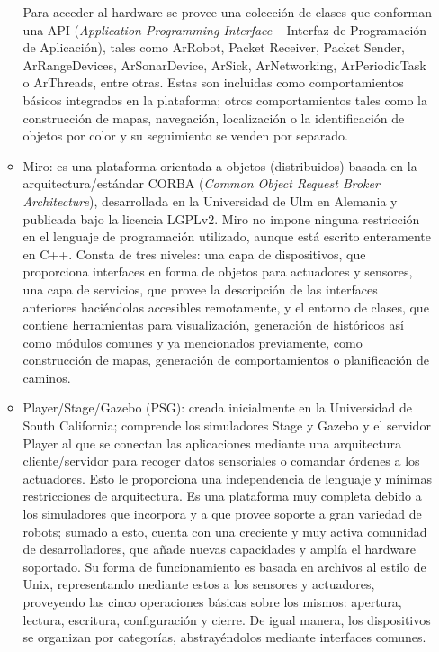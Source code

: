 \begin{itemize}
\begin{itemize}
		Para acceder al hardware se provee una colección de clases que conforman una API (\textit{Application Programming Interface} -- Interfaz de Programación de Aplicación), tales como ArRobot, Packet Receiver, Packet Sender, ArRangeDevices, ArSonarDevice, ArSick, ArNetworking, ArPeriodicTask o ArThreads, entre otras. Estas son incluidas como comportamientos básicos integrados en la plataforma; otros comportamientos tales como la construcción de mapas, navegación, localización o la identificación de objetos por color y su seguimiento se venden por separado.

		\item Miro: es una plataforma orientada a objetos (distribuidos) basada en la arquitectura/estándar CORBA (\textit{Common Object Request Broker Architecture}), desarrollada en la Universidad de Ulm en Alemania y publicada bajo la licencia LGPLv2. Miro no impone ninguna restricción en el lenguaje de programación utilizado, aunque está escrito enteramente en C++.  Consta de tres niveles: una capa de dispositivos, que proporciona interfaces en forma de objetos para actuadores y sensores, una capa de servicios, que provee la descripción de las interfaces anteriores haciéndolas accesibles remotamente, y el entorno de clases, que contiene herramientas para visualización, generación de históricos así como módulos comunes y ya mencionados previamente, como construcción de mapas, generación de comportamientos o planificación de caminos.

		\item Player/Stage/Gazebo (PSG): creada inicialmente en la Universidad de South California; comprende los simuladores Stage y Gazebo y el servidor Player al que se conectan las aplicaciones mediante una arquitectura cliente/servidor para recoger datos sensoriales o comandar órdenes a los actuadores. Esto le proporciona una independencia de lenguaje y mínimas restricciones de arquitectura. Es una plataforma muy completa debido a los simuladores que incorpora y a que provee soporte a gran variedad de robots; sumado a esto, cuenta con una creciente y muy activa comunidad de desarrolladores, que añade nuevas capacidades y amplía el hardware soportado. Su forma de funcionamiento es basada en archivos al estilo de Unix, representando mediante estos a los sensores y actuadores, proveyendo las cinco operaciones básicas sobre los mismos: apertura, lectura, escritura, configuración y cierre. De igual manera, los dispositivos se organizan por categorías, abstrayéndolos mediante interfaces comunes.
	\end{itemize}
\end{itemize}


